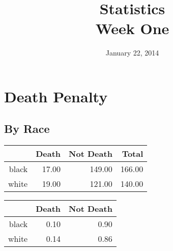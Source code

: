 \documentclass{exam}
\author{}
\date{January 22, 2014}
\title{Statistics \\ Week One}
\begin{document}
  \maketitle
  \section{Death Penalty}
  
  \subsection{By Race}

  \begin{table}[ht]
    \begin{tabular}{rrrr}
      \toprule
            & Death & Not Death & Total \\
      \midrule
      black & 17.00 & 149.00    & 166.00 \\
      white & 19.00 & 121.00    & 140.00 \\
       \bottomrule
    \end{tabular}
  \end{table}

  \begin{table}[ht]
    \begin{tabular}{rrr}
      \toprule
                & Death & Not Death \\
      \midrule
      black     & 0.10  & 0.90 \\
      white     & 0.14  & 0.86 \\
       \bottomrule
    \end{tabular}
  \end{table}
\end{document}
